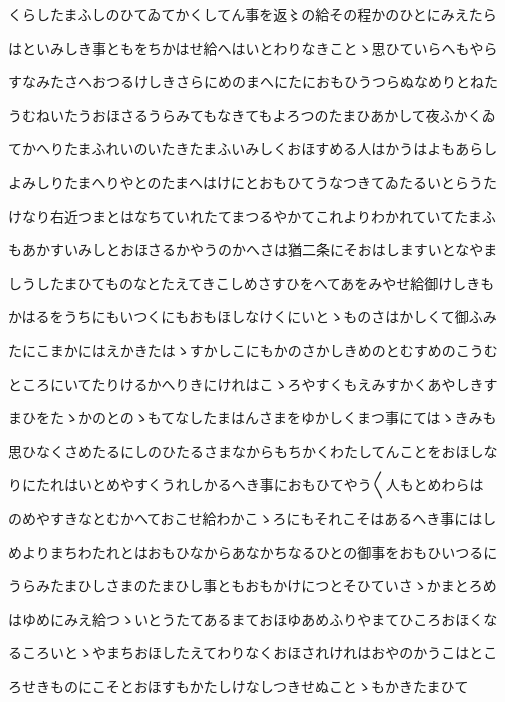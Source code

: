\documentclass[a4paper,11pt,landscape]{ltjtarticle}
\begin{document}
\par\medskip
くらしたまふしのひてゐてかくしてん事を返〻の給その程かのひとにみえたら
\par\medskip
はといみしき事ともをちかはせ給へはいとわりなきことゝ思ひていらへもやら
\par\medskip
すなみたさへおつるけしきさらにめのまへにたにおもひうつらぬなめりとねた
\par\medskip
うむねいたうおほさるうらみてもなきてもよろつのたまひあかして夜ふかくゐ
\par\medskip
てかへりたまふれいのいたきたまふいみしくおほすめる人はかうはよもあらし
\par\medskip
よみしりたまへりやとのたまへはけにとおもひてうなつきてゐたるいとらうた
\par\medskip
けなり右近つまとはなちていれたてまつるやかてこれよりわかれていてたまふ
\par\medskip
もあかすいみしとおほさるかやうのかへさは猶二条にそおはしますいとなやま
\par\medskip
しうしたまひてものなとたえてきこしめさすひをへてあをみやせ給御けしきも
\par\medskip
かはるをうちにもいつくにもおもほしなけくにいとゝものさはかしくて御ふみ
\par\medskip
たにこまかにはえかきたはゝすかしこにもかのさかしきめのとむすめのこうむ
\par\medskip
ところにいてたりけるかへりきにけれはこゝろやすくもえみすかくあやしきす
\par\medskip
まひをたゝかのとのゝもてなしたまはんさまをゆかしくまつ事にてはゝきみも
\par\medskip
思ひなくさめたるにしのひたるさまなからもちかくわたしてんことをおほしな
\par\medskip
りにたれはいとめやすくうれしかるへき事におもひてやう〱人もとめわらは
\par\medskip
のめやすきなとむかへておこせ給わかこゝろにもそれこそはあるへき事にはし
\par\medskip
めよりまちわたれとはおもひなからあなかちなるひとの御事をおもひいつるに
\par\medskip
うらみたまひしさまのたまひし事ともおもかけにつとそひていさゝかまとろめ
\par\medskip
はゆめにみえ給つゝいとうたてあるまておほゆあめふりやまてひころおほくな
\par\medskip
るころいとゝやまちおほしたえてわりなくおほされけれはおやのかうこはとこ
\par\medskip
ろせきものにこそとおほすもかたしけなしつきせぬことゝもかきたまひて
\par\medskip
\end{document}
